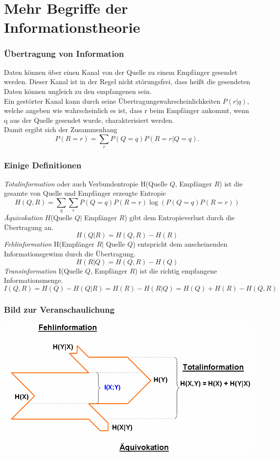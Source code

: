 \section{Mehr Begriffe der Informationstheorie}
\begin{frame}
\frametitle{Übertragung von Information}
Daten können über einen Kanal von der Quelle zu einem Empfänger gesendet werden. Dieser Kanal ist in der Regel nicht störungsfrei, dass heißt die gesendeten Daten können ungleich zu den empfangenen sein.\\ 
Ein gestörter Kanal kann durch seine Übertragungswahrscheinlichkeiten $P(r|q)$, welche angeben wie wahrscheinlich es ist, dass r beim Empfänger ankommt, wenn q aus der Quelle gesendet wurde, charakterisiert werden.\\
Damit ergibt sich der Zusammenhang \[P(R=r)=\sum_{r} P(Q=q)P(R=r|Q=q).\]
\end{frame}
\begin{frame}
\frametitle{Einige Definitionen}
\emph{Totalinformation} oder auch Verbundentropie H(Quelle $Q$, Empfänger $R$) ist die gesamte von Quelle und Empfänger erzeugte Entropie
\[H(Q,R)=\sum_{q} \sum_{r} P(Q=q)P(R=r)\log(P(Q=q)P(R=r))\]
\emph{Äquivokation} $H$(Quelle $Q|$ Empfänger $R$) gibt dem Entropieverlust durch die Übertragung an.\\
\[H(Q|R)=H(Q,R)-H(R)\]
\emph{Fehlinformation} H(Empfänger $R|$ Quelle $Q$) entspricht dem anscheinenden Informationsgewinn durch die Übertragung.
\[H(R|Q)=H(Q,R)-H(Q)\]
\emph{Transinformation} I(Quelle $Q$, Empfänger $R$) ist die richtig empfangene Informationsmenge.
\[I(Q,R)= H(Q)-H(Q|R)=H(R)-H(R|Q)=H(Q)+H(R)-H(Q,R)\]
\end{frame}
\begin{frame}
\frametitle{Bild zur Veranschaulichung}
\begin{center}
\includegraphics[scale=0.35]{images/Entropie_XY}
\end{center}
\end{frame}
